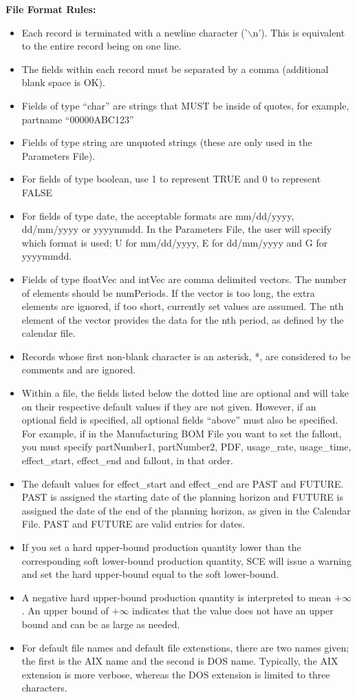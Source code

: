 \noindent
{\bf File Format Rules:}
\begin{itemize}
\item Each record is terminated with a newline character ('$\backslash$n').  This is
  equivalent to the entire record being on one line.
\item The fields within each record must be separated by a comma (additional
  blank space is OK).
\item Fields of type ``char'' are strings that MUST be inside of quotes, for example,
  partname ``00000ABC123''
\item Fields of type string are unquoted strings (these are only used
  in the Parameters File).
\item For fields of type boolean, use 1 to represent TRUE and 0 to
  represent FALSE
\item For fields of type date, the acceptable formats are mm/dd/yyyy, 
  dd/mm/yyyy or yyyymmdd.  In the Parameters File, the user will specify which
  format is used;  U for mm/dd/yyyy, E for dd/mm/yyyy and G for yyyymmdd.
\item Fields of type floatVec and intVec are comma delimited vectors.
  The number of elements should be numPeriods.  If the vector is too
  long, the extra elements are ignored, if too short,  currently set
  values are assumed.  The nth element of the vector provides the
  data for the nth period, as defined by the calendar file.
\item Records whose first non-blank character is an asterisk, *, are 
  considered to be comments and are ignored.
\item Within a file, the fields listed below the dotted line are optional and
 will take on their respective default values if they are not given.  However,
 if an optional field is specified, all optional fields ``above'' must also be
 specified.  For example, if in the Manufacturing BOM File you want to set the
 fallout, you must specify partNumber1, partNumber2, PDF, usage\_rate, 
 usage\_time, effect\_start, effect\_end and fallout, in that order.
\item The default values for effect\_start and effect\_end are PAST and FUTURE.
PAST is assigned the starting date of the planning horizon
and FUTURE is assigned the date of the end of the 
planning horizon, as given in the Calendar File.  PAST and FUTURE are valid entries
for dates.
\item If you set a hard upper-bound production quantity lower than 
the corresponding soft lower-bound production quantity, SCE will issue
a warning and set the hard upper-bound equal to the soft lower-bound.
\item A negative hard upper-bound production quantity is interpreted to
mean $+\infty$.  An upper bound of $+\infty$ indicates that the value
does not have an upper bound and can be as large as needed.
\item For default file names and default file extenstions, there are two
names given;  the first is the AIX name and the second is DOS name.  
Typically, the AIX extension is more verbose, whereas the DOS 
extension is limited to three characters.

\end{itemize}

